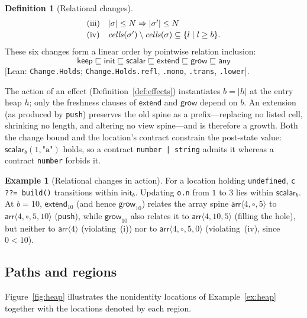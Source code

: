 \documentclass[10pt,a4paper]{article}
\theoremstyle{definition}
\newtheorem{definition}[theorem]{Definition}
\newtheorem{example}[theorem]{Example}
\theoremstyle{remark}
\newcommand{\kw}[1]{\mathsf{#1}}
\newcommand{\keep}{\kw{keep}}
\newcommand{\init}{\kw{init}}
\newcommand{\extend}{\kw{extend}}
\newcommand{\grow}{\kw{grow}}
\newcommand{\any}{\kw{any}}
\newcommand{\len}[1]{|#1|}
\newcommand{\code}[1]{\texttt{#1}}
\newcommand{\lean}[1]{\texttt{\small #1}}
\newcommand{\status}[1]{\textsf{\small[#1]}}
\begin{document}
\begin{definition}[Relational changes]
{\begin{displaymath}
\begin{array}{@{}ll@{}}
\text{(iii)} & \len\sigma\le N\Rightarrow\len{\sigma'}\le N\\[2pt]
\text{(iv)} & \mathit{cells}(\sigma')\setminus\mathit{cells}(\sigma)\subseteq\{l\mid l\ge b\}.
\end{array}
\end{displaymath}}
These six changes form a linear order by pointwise relation inclusion:
\[
\keep\sqsubseteq\init\sqsubseteq\kw{scalar}\sqsubseteq\extend\sqsubseteq\grow\sqsubseteq\any
\]
\status{Lean: \lean{Change.Holds}; \lean{Change.Holds.refl}, \lean{.mono}, \lean{.trans}, \lean{.lower}}.
\end{definition}

\noindent
The action of an effect (Definition~\ref{def:effects}) instantiates
$b=\len h$ at the entry heap $h$; only the freshness clauses of $\extend$
and $\grow$ depend on $b$. An extension (as produced by \code{push})
preserves the old spine as a prefix---replacing no listed cell, shrinking
no length, and altering no view spine---and is therefore a growth.
Both the change bound and the location's contract constrain the post-state
value: $\kw{scalar}_b(1,\code{"a"})$ holds, so a contract
\code{number | string} admits it whereas a contract \code{number} forbids
it.

\begin{example}[Relational changes in action]
For a location holding \code{undefined}, \code{c ??= build()} transitions
within $\init_b$. Updating \code{o.n} from $1$ to $3$ lies within
$\kw{scalar}_b$. At $b=10$, $\extend_{10}$ (and hence $\grow_{10}$) relates
the array spine $\mathsf{arr}\langle 4,\circ,5\rangle$ to
$\mathsf{arr}\langle 4,\circ,5,10\rangle$ (\code{push}), while $\grow_{10}$
also relates it to $\mathsf{arr}\langle 4,10,5\rangle$ (filling the hole),
but neither to $\mathsf{arr}\langle 4\rangle$ (violating~(i)) nor to
$\mathsf{arr}\langle 4,\circ,5,0\rangle$ (violating~(iv), since $0<10$).
\end{example}

\subsection{Paths and regions}

Figure~\ref{fig:heap} illustrates the nonidentity locations of
Example~\ref{ex:heap} together with the locations denoted by each region.
\end{document}

